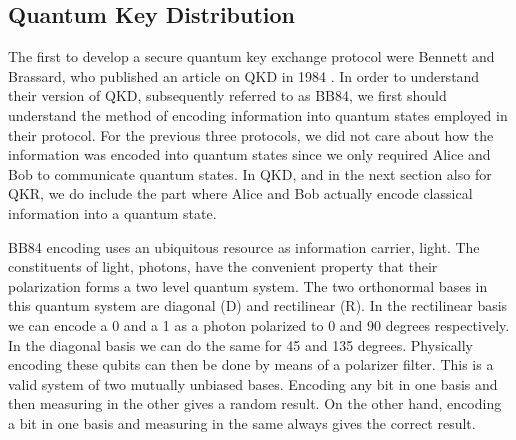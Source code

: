 \documentclass[]{article}
\begin{document}
\subsection{Quantum Key Distribution}

\label{QuantumKeyDistribution}

The first to develop a secure quantum key exchange protocol were Bennett and Brassard, who published an article on QKD in 1984 \cite{BB84}. In order to understand their version of QKD, subsequently referred to as BB84, we first should understand the method of encoding information into quantum states employed in their protocol. For the previous three protocols, we did not care about how the information was encoded into quantum states since we only required Alice and Bob to communicate quantum states. In QKD, and in the next section also for QKR, we do include the part where Alice and Bob actually encode classical information into a quantum state.

BB84 encoding uses an ubiquitous resource as information carrier, light. The constituents of light, photons, have the convenient property that their polarization forms a two level quantum system. The two orthonormal bases in this quantum system are diagonal (D) and rectilinear (R). In the rectilinear basis we can encode a 0 and a 1 as a photon polarized to 0 and 90 degrees respectively. In the diagonal basis we can do the same for 45 and 135 degrees. Physically encoding these qubits can then be done by means of a polarizer filter. This is a valid system of two mutually unbiased bases. Encoding any bit in one basis and then measuring in the other gives a random result. On the other hand, encoding a bit in one basis and measuring in the same always gives the correct result. 
\end{document}

